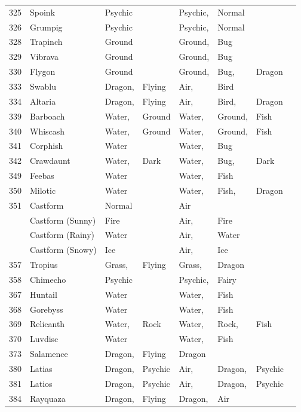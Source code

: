 \documentclass{article}
\begin{document}
\begin{longtable}{rl|ll|llll}
325 & Spoink & Psychic &  & Psychic, & Normal &  &  \\
326 & Grumpig & Psychic &  & Psychic, & Normal &  &  \\
328 & Trapinch & Ground &  & Ground, & Bug &  &  \\
329 & Vibrava & Ground &  & Ground, & Bug &  &  \\
330 & Flygon & Ground &  & Ground, & Bug, & Dragon &  \\
333 & Swablu & Dragon, & Flying & Air, & Bird &  &  \\
334 & Altaria & Dragon, & Flying & Air, & Bird, & Dragon &  \\
339 & Barboach & Water, & Ground & Water, & Ground, & Fish &  \\
340 & Whiscash & Water, & Ground & Water, & Ground, & Fish &  \\
341 & Corphish & Water &  & Water, & Bug &  &  \\
342 & Crawdaunt & Water, & Dark & Water, & Bug, & Dark &  \\
349 & Feebas & Water &  & Water, & Fish &  &  \\
350 & Milotic & Water &  & Water, & Fish, & Dragon &  \\
351 & Castform & Normal &  & Air &  &  &  \\
    & Castform (Sunny) & Fire &  & Air, & Fire &  &  \\
    & Castform (Rainy) & Water &  & Air, & Water &  &  \\
    & Castform (Snowy) & Ice &  & Air, & Ice &  &  \\
357 & Tropius & Grass, & Flying & Grass, & Dragon &  &  \\
358 & Chimecho & Psychic &  & Psychic, & Fairy &  &  \\
367 & Huntail & Water &  & Water, & Fish &  &  \\
368 & Gorebyss & Water &  & Water, & Fish &  &  \\
369 & Relicanth & Water, & Rock & Water, & Rock, & Fish &  \\
370 & Luvdisc & Water &  & Water, & Fish &  &  \\
373 & Salamence & Dragon, & Flying & Dragon &  &  &  \\
380 & Latias & Dragon, & Psychic & Air, & Dragon, & Psychic &  \\
381 & Latios & Dragon, & Psychic & Air, & Dragon, & Psychic &  \\
384 & Rayquaza & Dragon, & Flying & Dragon, & Air &  &  \\

\end{longtable}
\end{document}
